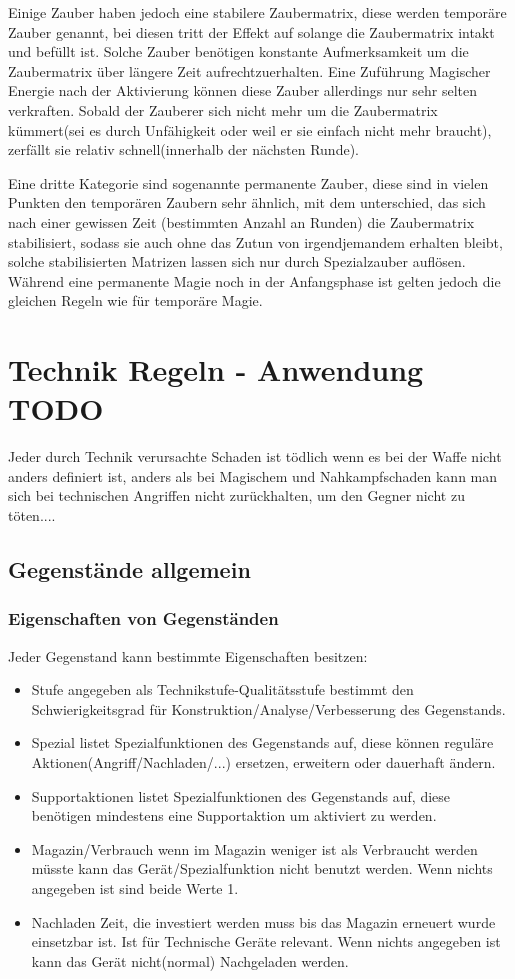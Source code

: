 Einige Zauber haben jedoch eine stabilere Zaubermatrix, diese werden temporäre Zauber genannt, bei diesen tritt der Effekt auf solange die Zaubermatrix intakt und befüllt ist. Solche Zauber benötigen konstante Aufmerksamkeit um die Zaubermatrix über längere Zeit aufrechtzuerhalten. Eine Zuführung Magischer Energie nach der Aktivierung können diese Zauber allerdings nur sehr selten verkraften. Sobald der Zauberer sich nicht mehr um die Zaubermatrix kümmert(sei es durch Unfähigkeit oder weil er sie einfach nicht mehr braucht), zerfällt sie relativ schnell(innerhalb der nächsten Runde).

Eine dritte Kategorie sind sogenannte permanente Zauber, diese sind in vielen Punkten den temporären Zaubern sehr ähnlich, mit dem unterschied, das sich nach einer gewissen Zeit (bestimmten Anzahl an Runden) die Zaubermatrix stabilisiert, sodass sie auch ohne das Zutun von irgendjemandem erhalten bleibt, solche stabilisierten Matrizen lassen sich nur durch Spezialzauber auflösen.
Während eine permanente Magie noch in der Anfangsphase ist gelten jedoch die gleichen Regeln wie für temporäre Magie.

\chapter{Technik Regeln - Anwendung TODO}

Jeder durch Technik verursachte Schaden ist tödlich wenn es bei der Waffe nicht anders definiert ist, anders als bei Magischem und Nahkampfschaden kann man sich bei technischen Angriffen nicht zurückhalten, um den Gegner nicht zu töten....

\section{Gegenstände allgemein}
\subsection{Eigenschaften von Gegenständen}
Jeder Gegenstand kann bestimmte Eigenschaften besitzen:

\begin{itemize}
\item Stufe angegeben als Technikstufe-Qualitätsstufe bestimmt den Schwierigkeitsgrad für Konstruktion/Analyse/Verbesserung des Gegenstands.
\item Spezial listet Spezialfunktionen des Gegenstands auf, diese können reguläre Aktionen(Angriff/Nachladen/...) ersetzen, erweitern oder dauerhaft ändern.
\item Supportaktionen listet Spezialfunktionen des Gegenstands auf, diese benötigen mindestens eine Supportaktion um aktiviert zu werden.
\item Magazin/Verbrauch wenn im Magazin weniger ist als Verbraucht werden müsste kann das Gerät/Spezialfunktion nicht benutzt werden. Wenn nichts angegeben ist sind beide Werte 1.
\item Nachladen Zeit, die investiert werden muss bis das Magazin erneuert wurde einsetzbar ist. Ist für Technische Geräte relevant. Wenn nichts angegeben ist kann das Gerät nicht(normal) Nachgeladen werden.
\end{itemize}

